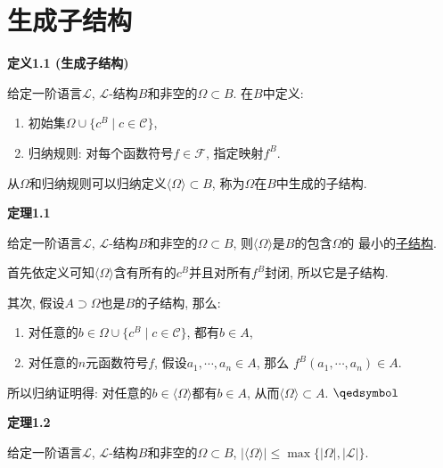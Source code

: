 


\setlength{\abovedisplayskip}{1pt}
\setlength{\belowdisplayskip}{1pt}

\section{生成子结构}

\hypertarget{sec:定义1.1}{}
\noindent\textbf{定义1.1 (生成子结构)}

给定一阶语言$\mathcal{L}$, $\mathcal{L}$-结构$B$和非空的$\Omega\subset B$.
在$B$中定义:
\begin{enumerate}
    \item 初始集$\Omega\cup\{c^B\mid c\in\mathcal{C}\}$,
    \item 归纳规则: 对每个函数符号$f\in\mathcal{F}$, 指定映射$f^B$.
\end{enumerate}
从$\Omega$和归纳规则可以归纳定义$\langle\Omega\rangle\subset B$,
称为$\Omega$在$B$中生成的子结构.

\vspace{10pt}

\hypertarget{sec:定理1.1}{}
\noindent\textbf{定理1.1}

给定一阶语言$\mathcal{L}$, $\mathcal{L}$-结构$B$和非空的$\Omega\subset B$,
则$\langle\Omega\rangle$是$B$的包含$\Omega$的
最小的\href{03 子结构#nameddest=sec:定义1.1}{子结构}.


首先依定义可知$\langle\Omega\rangle$含有所有的$c^B$并且对所有$f^B$封闭, 所以它是子结构.

其次, 假设$A\supset\Omega$也是$B$的子结构, 那么:
\begin{enumerate}
    \item 对任意的$b\in\Omega\cup\{c^B\mid c\in\mathcal{C}\}$, 都有$b\in A$,
    \item 对任意的$n$元函数符号$f$, 假设$a_1,\cdots,a_n\in A$, 那么
    $f^B(a_1,\cdots,a_n)\in A$.
\end{enumerate}

所以归纳证明得: 对任意的$b\in\langle\Omega\rangle$都有$b\in A$,
从而$\langle\Omega\rangle\subset A$. \hfill $\qedsymbol$

\vspace{10pt}

\hypertarget{sec:定理1.2}{}
\noindent\textbf{定理1.2}

给定一阶语言$\mathcal{L}$, $\mathcal{L}$-结构$B$和非空的$\Omega\subset B$,
$|\langle\Omega\rangle|\leqslant\max\{|\Omega|,|\mathcal{L}|\}$.

